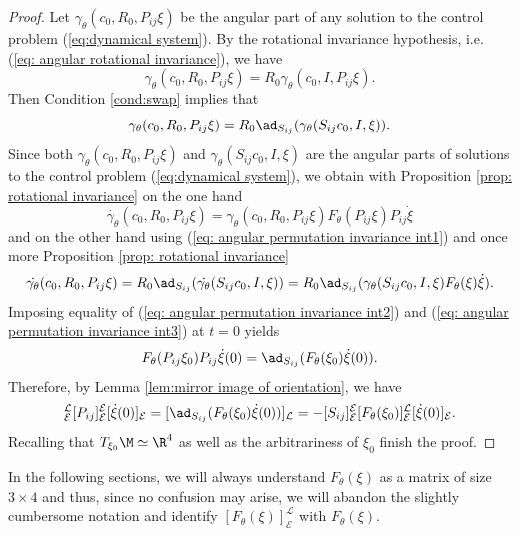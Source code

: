 \begin{proof}
Let $\gamma_\theta(c_0, R_0, P_{ij}\xi)$ be the angular part of any solution to the control problem (\ref{eq:dynamical system}). By the rotational invariance hypothesis, i.e. (\ref{eq: angular rotational invariance}), we have
\begin{equation}
	\gamma_\theta(c_0, R_0, P_{ij}\xi) = R_0 \gamma_\theta(c_0, I,P_{ij} \xi).
\end{equation}
Then Condition \ref{cond:swap} implies that
\begin{equation}
\label{eq: angular permutation invariance int1}
	\gamma_\theta(c_0, R_0,P_{ij} \xi) = R_0 \ad_{S_{ij}}( \gamma_\theta(S_{ij}c_0, I, \xi)).
\end{equation}
Since both $\gamma_\theta(c_0, R_0, P_{ij} \xi)$ and $\gamma_\theta(S_{ij} c_0, I, \xi)$ are the angular parts of solutions to the control problem (\ref{eq:dynamical system}), we obtain with Proposition \ref{prop: rotational invariance} on the one hand
\begin{equation}
\label{eq: angular permutation invariance int2}
	\dot{\gamma_\theta}(c_0, R_0, P_{ij} \xi)= \gamma_\theta(c_0, R_0, P_{ij} \xi) F_{\theta}(P_{ij} \xi) P_{ij } \dot{\xi}
\end{equation}
and on the other hand using (\ref{eq: angular permutation invariance int1}) and once more Proposition \ref{prop: rotational invariance}
\begin{equation}
\label{eq: angular permutation invariance int3}
	\dot{\gamma_\theta}(c_0, R_0, P_{ij} \xi) =  R_0 \ad_{S_{ij}}( \dot{\gamma_\theta}(S_{ij} c_0, I, \xi)) = R_0 \ad_{S_{ij}}( \gamma_\theta(S_{ij} c_0, I, \xi) F_{\theta}(\xi) \dot{\xi}).
\end{equation}
Imposing equality of (\ref{eq: angular permutation invariance int2}) and (\ref{eq: angular permutation invariance int3}) at $t = 0$ yields
\begin{equation}
	F_{\theta}(P_{ij} \xi_0) P_{ij}  \dot{\xi}(0) = \ad_{S_{ij}} (F_{\theta}(\xi_0) \dot{\xi}(0)).
\end{equation}
Therefore, by Lemma \ref{lem:mirror image of orientation}, we have
\begin{equation}
	[F_{\theta}(P_{ij} \xi_0)]_{\mathcal{E}}^{\mathcal{L}}  [P_{ij}]_{\mathcal{E}}^{\mathcal{E}} [\dot{\xi}(0)]_{\mathcal{E}} = [\ad_{S_{ij}}( F_{\theta}(\xi_0) \dot{\xi}(0))]_{\mathcal{L}} = -[S_{ij}]_{\mathcal{E}}^{\mathcal{E}} [F_{\theta}(\xi_0)]_{\mathcal{E}}^{\mathcal{L}} [\dot{\xi}(0)]_{\mathcal{E}}.
\end{equation}
Recalling that $T_{\xi_0} \M \simeq \R^4$ as well as the arbitrariness of $\xi_0$ finish the proof.
\end{proof}

In the following sections, we will always understand $F_{\theta}(\xi)$ as a matrix of size $3 \times 4$ and thus, since no confusion may arise, we will abandon the slightly cumbersome notation and identify $[F_{\theta}(\xi)]_{\mathcal{E}}^{\mathcal{L}}$ with $F_{\theta}(\xi)$.





